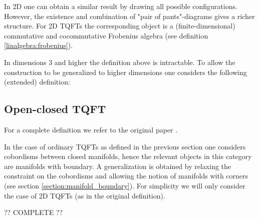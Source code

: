     \begin{example}[2D]
        In 2D one can obtain a similar result by drawing all possible configurations. However, the existence and combination of "pair of pants"-diagrams gives a richer structure. For 2D TQFTs the corresponding object is a (finite-dimensional) commutative and cocommutative Frobenius algebra (see definition \ref{linalgebra:frobenius}).
    \end{example}

    In dimensions 3 and higher the definition above is intractable. To allow the construction to be generalized to higher dimensions one considers the following (extended) definition:

\subsection{Open-closed TQFT}

    For a complete definition we refer to the original paper \cite{open_closed}.

    In the case of ordinary TQFTs as defined in the previous section one considers cobordisms between closed manifolds, hence the relevant objects in this category are manifolds with boundary. A generalization is obtained by relaxing the constraint on the cobordisms and allowing the notion of manifolds with corners (see section \ref{section:manifold_boundary}). For simplicity we will only consider the case of 2D TQFTs (as in the original definition).

    ?? COMPLETE ??